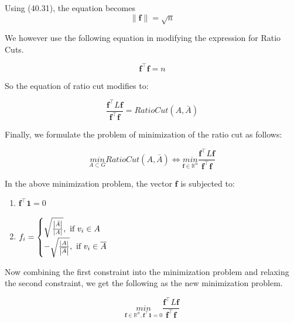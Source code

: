 \documentclass[english]{article}
\theoremstyle{plain}
\begin{document}
\begin{enumerate}
Using (40.31), the equation becomes
\begin{equation}
\|\boldsymbol{f}\| = \sqrt{n}
\end{equation}

We however use the following equation in modifying the expression for Ratio Cuts.

\begin{equation}
\boldsymbol{f}^{\top}\boldsymbol{f} = n
\end{equation}

So the equation of ratio cut modifies to:

\begin{equation}
\frac{\boldsymbol{f}^{\top}L\boldsymbol{f}}{\boldsymbol{f}^{\top}\boldsymbol{f}} = Ratio Cut(A,\bar{A})
\end{equation}

\end{enumerate}

Finally, we formulate the problem of minimization of the ratio cut as follows:

\begin{equation}
\underset{A \subset G}{min} RatioCut(A,\bar{A}) 
\iff \underset{\boldsymbol{f} \in \mathbb{R}^{n}}{min} \frac{\boldsymbol{f}^{\top}L\boldsymbol{f}}{\boldsymbol{f}^{\top}\boldsymbol{f}}
\end{equation}

In the above minimization problem, the vector $\boldsymbol{f}$ is subjected to:
\begin{enumerate}
\item $\boldsymbol{f}^{\top}\boldsymbol{1} = 0$
\item $f_{i} = \begin{cases}
\sqrt{\frac{\left| \bar{A} \right|}{\left| A \right|}}, \textnormal{ if } v_{i} \in A \\
-\sqrt{\frac{\left| A \right|}{\left| \overline{A} \right|}}, \textnormal{ if } v_{i} \in \overline{A}\\
\end{cases}$
\end{enumerate}


Now combining the first constraint into the minimization problem and relaxing the second constraint, we get the following as the new minimization problem.

\begin{equation}
\underset{\boldsymbol{f} \in \mathbb{R}^{n},\boldsymbol{f}^{\top}\boldsymbol{1}=0}{min} \frac{\boldsymbol{f}^{\top}L\boldsymbol{f}}{\boldsymbol{f}^{\top}\boldsymbol{f}}
\end{equation}
\end{document}
